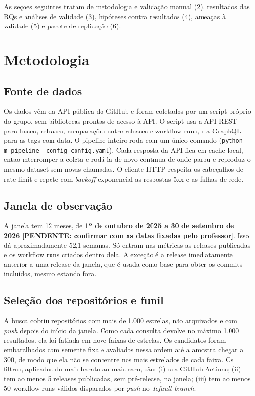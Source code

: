 \documentclass[12pt]{article}
\begin{document}
As seções seguintes tratam de metodologia e validação manual (2), resultados das RQs e análises de validade (3), hipóteses contra resultados (4), ameaças à validade (5) e pacote de replicação (6).


\section{Metodologia}

\subsection{Fonte de dados}

Os dados vêm da API pública do GitHub e foram coletados por um script próprio do grupo, sem bibliotecas prontas de acesso à API. O script usa a API REST para busca, releases, comparações entre releases e workflow runs, e a GraphQL para as tags com data. O pipeline inteiro roda com um único comando (\texttt{python -m pipeline --config config.yaml}). Cada resposta da API fica em cache local, então interromper a coleta e rodá-la de novo continua de onde parou e reproduz o mesmo dataset sem novas chamadas. O cliente HTTP respeita os cabeçalhos de rate limit e repete com \emph{backoff} exponencial as respostas 5xx e as falhas de rede.

\subsection{Janela de observação}

A janela tem 12 meses, de \textbf{1º de outubro de 2025 a 30 de setembro de 2026} \textbf{[PENDENTE: confirmar com as datas fixadas pelo professor]}. Isso dá aproximadamente 52,1 semanas. Só entram nas métricas as releases publicadas e os workflow runs criados dentro dela. A exceção é a release imediatamente anterior a uma release da janela, que é usada como base para obter os commits incluídos, mesmo estando fora.

\subsection{Seleção dos repositórios e funil}

A busca cobriu repositórios com mais de 1.000 estrelas, não arquivados e com \emph{push} depois do início da janela. Como cada consulta devolve no máximo 1.000 resultados, ela foi fatiada em nove faixas de estrelas. Os candidatos foram embaralhados com semente fixa e avaliados nessa ordem até a amostra chegar a 300, de modo que ela não se concentre nos mais estrelados de cada faixa. Os filtros, aplicados do mais barato ao mais caro, são: (i) usa GitHub Actions; (ii) tem ao menos 5 releases publicadas, sem pré-release, na janela; (iii) tem ao menos 50 workflow runs válidos disparados por \emph{push} no \emph{default branch}.
\end{document}
